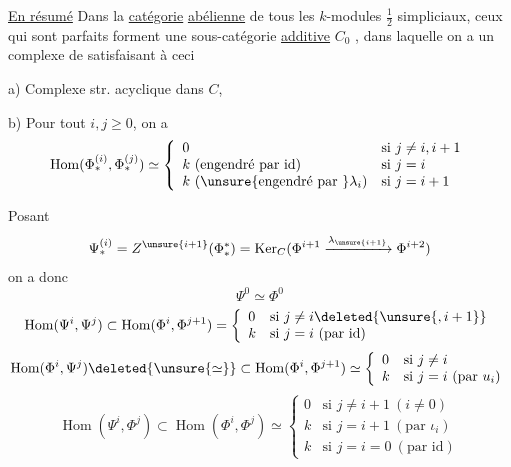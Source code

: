 \uline{En résumé} Dans la \uline{catégorie}
\uline{abélienne}  de tous les $k$-modules
$\frac12$ simpliciaux, ceux qui sont  parfaits
forment une sous-catégorie \uline{additive}
$C_0$ , dans laquelle
on a un complexe de 
satisfaisant à ceci

a) Complexe str. acyclique dans $C$, 

b) Pour tout $i,j\geq0$, on a
\[
\operatorname{Hom}(\Phi_*^{(i)},\Phi_*^{(j)})\simeq
\left\{\begin{array}{ll}
0&\text{si }j\neq i,i+1\\
k\ (\text{engendré par id})&\text{si }j=i\\
k\ (\unsure{\text{engendré par }}\lambda_i)&\text{si }j=i+1
\end{array}\right.
\]

 Posant
\[
\Psi_*^{(i)}=Z^{\unsure{i+1}}(\Phi_*^*)
=\operatorname{Ker}_C(\Phi^{i+1}\xrightarrow{\lambda_{\unsure{i+1}}}\Phi^{i+2})
\]
on a donc 
\[
\Psi^0\simeq\Phi^0
\]
\[
\operatorname{Hom}(\Psi^i,\Psi^j)
\subset\operatorname{Hom}(\Phi^i,\Phi^{j+1})=
\left\{\begin{array}{ll}
0&\text{si }j\neq i\deleted{\unsure{,i+1}}\\
k&\text{si }j=i\ (\text{par id})
\end{array}\right.
\]
\[
\operatorname{Hom}(\Phi^i,\Psi^j)\deleted{\unsure{\simeq}}
\subset\operatorname{Hom}(\Phi^i,\Phi^{j+1})\simeq
\left\{\begin{array}{ll}0&\text{si }j\neq i\\
k&\text{si }j=i\ (\text{par }u_i)
\end{array}\right.
\]
\[
\operatorname{Hom}(\Psi^i,\Phi^j)
\subset\operatorname{Hom}(\Phi^i,\Phi^j)\simeq
\left\{\begin{array}{ll}
0&\text{si }j\neq i+1\ (i\neq0)\\
k&\text{si }j=i+1\ (\text{par }\iota_i)\\
k&\text{si }j=i=0\ (\text{par id})
\end{array}\right.
\]

